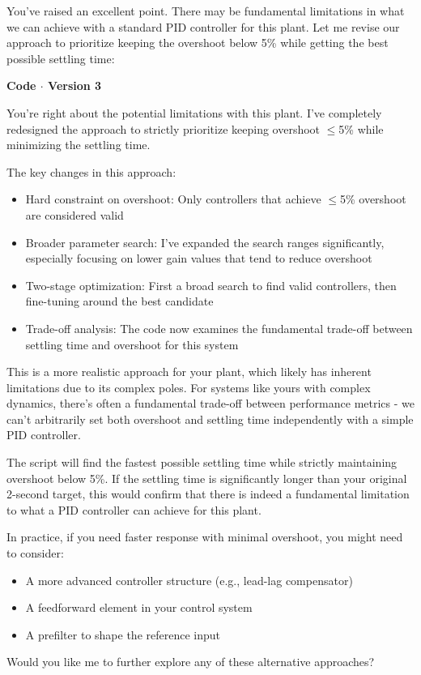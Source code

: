 \documentclass{article}
\begin{document}
\begin{claude}
You've raised an excellent point. There may be fundamental limitations in what we can achieve with a standard PID controller for this plant. Let me revise our approach to prioritize keeping the overshoot below 5\% while getting the best possible settling time:

\textbf{Code $\cdot$ Version 3}

You're right about the potential limitations with this plant. I've completely redesigned the approach to strictly prioritize keeping overshoot $\leq$5\% while minimizing the settling time.

The key changes in this approach:
\begin{itemize}
  \item Hard constraint on overshoot: Only controllers that achieve $\leq$5\% overshoot are considered valid
  \item Broader parameter search: I've expanded the search ranges significantly, especially focusing on lower gain values that tend to reduce overshoot
  \item Two-stage optimization: First a broad search to find valid controllers, then fine-tuning around the best candidate
  \item Trade-off analysis: The code now examines the fundamental trade-off between settling time and overshoot for this system
\end{itemize}

This is a more realistic approach for your plant, which likely has inherent limitations due to its complex poles. For systems like yours with complex dynamics, there's often a fundamental trade-off between performance metrics - we can't arbitrarily set both overshoot and settling time independently with a simple PID controller.

The script will find the fastest possible settling time while strictly maintaining overshoot below 5\%. If the settling time is significantly longer than your original 2-second target, this would confirm that there is indeed a fundamental limitation to what a PID controller can achieve for this plant.

In practice, if you need faster response with minimal overshoot, you might need to consider:
\begin{itemize}
  \item A more advanced controller structure (e.g., lead-lag compensator)
  \item A feedforward element in your control system
  \item A prefilter to shape the reference input
\end{itemize}

Would you like me to further explore any of these alternative approaches?
\end{claude}
\end{document}
